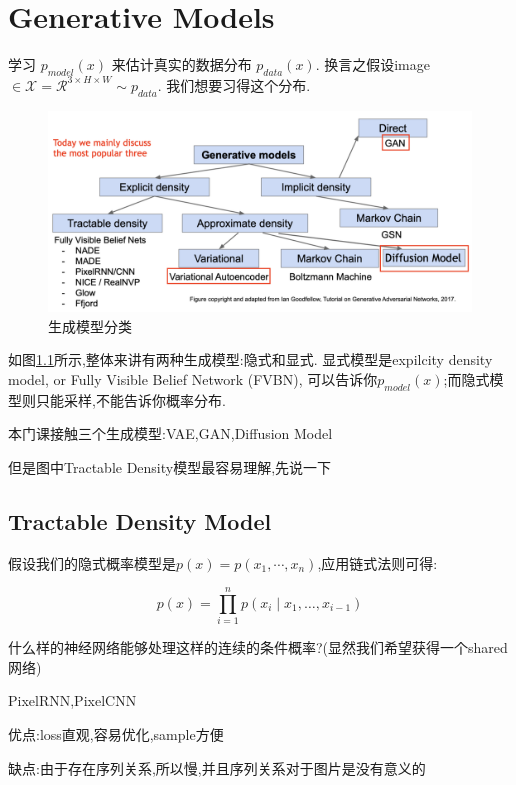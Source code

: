 \chapter{Generative Models}
	学习 $p_{model}(x)$ 来估计真实的数据分布 $p_{data}(x)$.
	换言之假设image$ \in \mathcal{X} = \mathcal{R}^{3\times H \times W}\sim p_{data}$.
	我们想要习得这个分布.

	\begin{figure}[htbp]
	\centering
	\includegraphics[scale=0.3]{figures/generative_model.png}
	\caption{生成模型分类}
	\label{fig:generative_model}
	\end{figure}

	如图\ref{fig:generative_model}所示,整体来讲有两种生成模型:隐式和显式.
	显式模型是expilcity density model, or Fully Visible Belief Network (FVBN), 
	可以告诉你$p_{model}(x)$;而隐式模型则只能采样,不能告诉你概率分布.
	
	本门课接触三个生成模型:VAE,GAN,Diffusion Model
	
	但是图中Tractable Density模型最容易理解,先说一下

	\section{Tractable Density Model}

	假设我们的隐式概率模型是$p(x) = p(x_1, \cdots, x_n)$,应用链式法则可得:
	
	\begin{equation}
		p(x)=\prod_{i=1}^{n} p\left(x_{i} \mid x_{1}, \ldots, x_{i-1}\right)
	\end{equation}
	
	什么样的神经网络能够处理这样的连续的条件概率?(显然我们希望获得一个shared网络)
	
	PixelRNN,PixelCNN
	
	优点:loss直观,容易优化,sample方便
	
	缺点:由于存在序列关系,所以慢,并且序列关系对于图片是没有意义的
	
